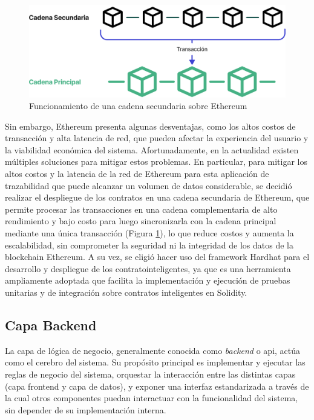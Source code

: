 \begin{figure}[!tb]
    \centering
    \includegraphics[width=0.9\linewidth]{Figures/blockchain-layer-2.png}
    \caption{Funcionamiento de una cadena secundaria sobre Ethereum}
    \label{fig:ethereum-layer-2}
\end{figure}

Sin embargo, Ethereum presenta algunas desventajas, como los altos costos de transacción y alta latencia de red, que pueden afectar la experiencia del usuario y la viabilidad económica del sistema. Afortunadamente, en la actualidad existen múltiples soluciones para mitigar estos problemas. En particular, para mitigar los altos costos y la latencia de la red de Ethereum para esta aplicación de trazabilidad que puede alcanzar un volumen de datos considerable, se decidió realizar el despliegue de los contratos en una cadena secundaria de Ethereum, que permite procesar las transacciones en una cadena complementaria de alto rendimiento y bajo costo para luego sincronizarla con la cadena principal mediante una única transacción (Figura \ref{fig:ethereum-layer-2}), lo que reduce costos y aumenta la escalabilidad, sin comprometer la seguridad ni la integridad de los datos de la blockchain Ethereum. A su vez, se eligió hacer uso del framework Hardhat para el desarrollo y despliegue de los \glspl{contratointeligente}, ya que es una herramienta ampliamente adoptada que facilita la implementación y ejecución de pruebas unitarias y de integración sobre contratos inteligentes en Solidity.

\subsection{Capa Backend}

La capa de lógica de negocio, generalmente conocida como \textit{\gls{backend}} o \acrfull{api}, actúa como el cerebro del sistema. Su propósito principal es implementar y ejecutar las reglas de negocio del sistema, orquestar la interacción entre las distintas capas (capa frontend y capa de datos), y exponer una interfaz estandarizada a través de la cual otros componentes puedan interactuar con la funcionalidad del sistema, sin depender de su implementación interna.

